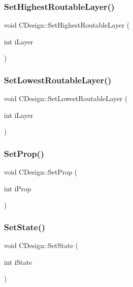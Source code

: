 \mbox{\label{classCDesign_a4dda519df38cb104e804522f76d826fe}} 
\subsubsection{\texorpdfstring{SetHighestRoutableLayer()}{SetHighestRoutableLayer()}}
{\footnotesize\ttfamily void C\+Design\+::\+Set\+Highest\+Routable\+Layer (\begin{DoxyParamCaption}\item[{int}]{i\+Layer }\end{DoxyParamCaption})}

\mbox{\label{classCDesign_af7d386170d501eb471b63b2f663690b0}} 
\subsubsection{\texorpdfstring{SetLowestRoutableLayer()}{SetLowestRoutableLayer()}}
{\footnotesize\ttfamily void C\+Design\+::\+Set\+Lowest\+Routable\+Layer (\begin{DoxyParamCaption}\item[{int}]{i\+Layer }\end{DoxyParamCaption})}

\mbox{\label{classCDesign_afc3a5c7e4453c76a44eec25c38c72135}} 
\subsubsection{\texorpdfstring{SetProp()}{SetProp()}}
{\footnotesize\ttfamily void C\+Design\+::\+Set\+Prop (\begin{DoxyParamCaption}\item[{int}]{i\+Prop }\end{DoxyParamCaption})}

\mbox{\label{classCDesign_adda7bcca7062f58a27baa043bd315bfd}} 
\subsubsection{\texorpdfstring{SetState()}{SetState()}}
{\footnotesize\ttfamily void C\+Design\+::\+Set\+State (\begin{DoxyParamCaption}\item[{int}]{i\+State }\end{DoxyParamCaption})}

